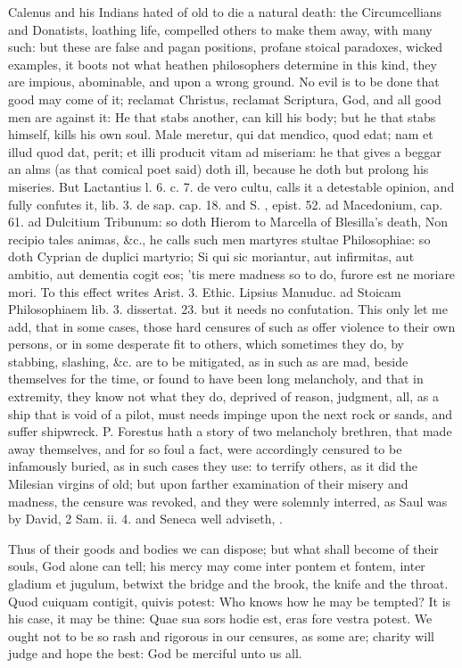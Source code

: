 Calenus and his Indians hated of old to die a natural death: the
Circumcellians and Donatists, loathing life, compelled others to make
them away, with many such: but these are false and pagan
positions, profane stoical paradoxes, wicked examples, it boots not
what heathen philosophers determine in this kind, they are impious,
abominable, and upon a wrong ground. No evil is to be done that good
may come of it; reclamat Christus, reclamat Scriptura, God, and all
good men are against it: He that stabs another, can kill his
body; but he that stabs himself, kills his own soul. Male
meretur, qui dat mendico, quod edat; nam et illud quod dat, perit; et
illi producit vitam ad miseriam: he that gives a beggar an alms (as
that comical poet said) doth ill, because he doth but prolong his
miseries. But Lactantius l. 6. c. 7. de vero cultu, calls it a
detestable opinion, and fully confutes it, lib. 3. de sap. cap. 18. and
S. \Austin, epist. 52. ad Macedonium, cap. 61. ad Dulcitium Tribunum: so
doth Hierom to Marcella of Blesilla's death, Non recipio tales animas,
\&c., he calls such men martyres stultae Philosophiae: so doth Cyprian
de duplici martyrio; Si qui sic moriantur, aut infirmitas, aut ambitio,
aut dementia cogit eos; 'tis mere madness so to do, furore est ne
moriare mori. To this effect writes Arist. 3. Ethic. Lipsius Manuduc.
ad Stoicam Philosophiaem lib. 3. dissertat. 23. but it needs no
confutation. This only let me add, that in some cases, those hard
censures of such as offer violence to their own persons, or in some
desperate fit to others, which sometimes they do, by stabbing,
slashing, \&c. are to be mitigated, as in such as are mad, beside
themselves for the time, or found to have been long melancholy, and
that in extremity, they know not what they do, deprived of reason,
judgment, all, as a ship that is void of a pilot, must needs
impinge upon the next rock or sands, and suffer shipwreck. P.
Forestus hath a story of two melancholy brethren, that made away
themselves, and for so foul a fact, were accordingly censured to be
infamously buried, as in such cases they use: to terrify others, as it
did the Milesian virgins of old; but upon farther examination of their
misery and madness, the censure was revoked, and they were
solemnly interred, as Saul was by David, 2 Sam. ii. 4. and Seneca well
adviseth, .

Thus of their goods and bodies we can dispose; but what shall become of
their souls, God alone can tell; his mercy may come inter pontem et
fontem, inter gladium et jugulum, betwixt the bridge and the brook, the
knife and the throat. Quod cuiquam contigit, quivis potest: Who knows
how he may be tempted? It is his case, it may be thine: Quae sua
sors hodie est, eras fore vestra potest. We ought not to be so rash and
rigorous in our censures, as some are; charity will judge and hope the
best: God be merciful unto us all.
